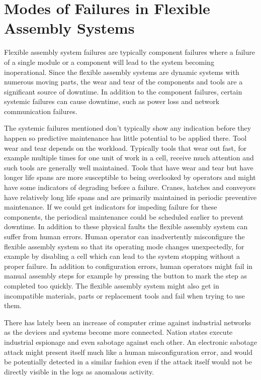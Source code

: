 \documentclass[journal]{IEEEtran}
\begin{document}
\section{Modes of Failures in Flexible Assembly Systems}

Flexible assembly system failures are typically component failures where a failure of a single module or a component will lead to the system becoming inoperational.
Since the flexible assembly systems are dynamic systems with numerous moving parts, the wear and tear of the components and tools are a significant source of downtime.
In addition to the component failures, certain systemic failures can cause downtime, such as power loss and network communication failures.

The systemic failures mentioned don't typically show any indication before they happen so predictive maintenance has little potential to be applied there. Tool wear and tear
depends on the workload. Typically tools that wear out fast, for example multiple times for one unit of work in a cell, receive much attention and such tools are generally
well maintained. Tools that have wear and tear but have longer life spans are more susceptible to being overlooked by operators and might have some indicators of degrading
before a failure. Cranes, hatches and conveyors have relatively long life spans and are primarily maintained in periodic preventive maintenance. If we could get indicators
for impeding failure for these components, the periodical maintenance could be scheduled earlier to prevent downtime. In addition to these physical faults the flexible
assembly system can suffer from human errors. Human operator can inadvertently misconfigure the flexible assembly system so that its operating mode changes unexpectedly,
for example by disabling a cell which can lead to the system stopping without a proper failure. In addition to configuration
errors, human operators might fail in manual assembly steps for example by pressing the button to mark the step
as completed too quickly.
The flexible assembly system might also get in incompatible materials, parts or replacement tools and fail when trying to use them.

There has lately been an increase of computer crime against industrial networks as the devices and systems become more connected.
Nation states execute industrial espionage and even sabotage against each other\cite{stuxnet}. An electronic sabotage attack might present itself
much like a human misconfiguration error, and would be potentially detected in a similar fashion even if the attack itself would not be
directly visible in the logs as anomalous activity.
\end{document}
